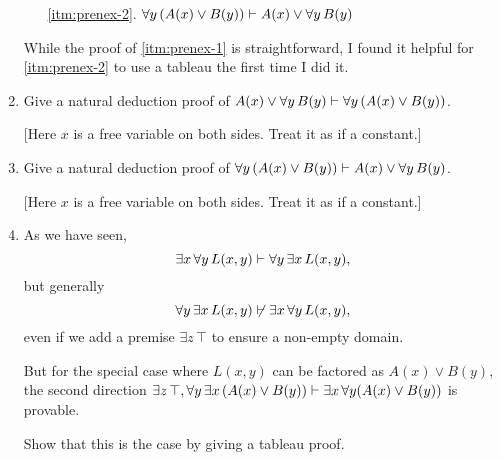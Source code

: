 \documentclass{cs81-homework}
\begin{document}
\begin{enumerate}
\begin{enumerate}
    \item[\ref{itm:prenex-2}.]
      \(\forall y \, (A(x) \lor B(y)) \vdash A(x) \lor \forall y \, B(y)\)
    \end{enumerate}
    While the proof of \ref{itm:prenex-1} is straightforward, I found it helpful
    for \ref{itm:prenex-2} to use a tableau the first time I did it.

    \mbox{}

\item \label{itm:prenex-1}  Give a natural deduction proof of
\(A(x) \lor \forall y \, B(y) \vdash \forall y \, (A(x) \lor B(y))\).

[Here \(x\) is a free variable on both sides. Treat it as if a constant.]

  \begin{solution}
  \end{solution}

\item \label{itm:prenex-2}  Give a natural deduction proof of
  \(\forall y \, (A(x) \lor B(y)) \vdash A(x) \lor \forall y \, B(y)\).

  [Here \(x\) is a free variable on both sides. Treat it as if a constant.]

  \begin{solution}
  \end{solution}

\item {} As we have seen,
  \[
    \exists x \, \forall y \, L(x, y) \vdash \forall y \, \exists x \, L(x, y),
  \]
  but generally
  \[
    \forall y \, \exists x \, L(x, y) \not \vdash \exists x \, \forall y \,
    L(x, y),
  \]
  even if we add a premise \(\exists z \, \top\) to ensure a non-empty domain.

  But for the special case where \(L(x, y)\) can be factored as
  \(A(x) \lor B(y)\), the second direction
  \(\exists z \, \top, \forall y \, \exists x \, (A(x) \lor B(y)) \vdash
  \exists x \, \forall y (A(x) \lor B(y))\) is provable.

  Show that this is the case by giving a tableau proof.

  \begin{solution}
  \end{solution}


\end{enumerate}
\end{document}
